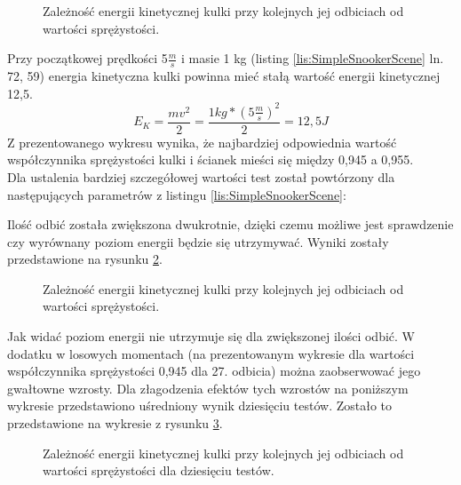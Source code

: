 \begin{figure}[h]

\caption{Zależność energii kinetycznej kulki przy kolejnych jej odbiciach od wartości
sprężystości.}
\label{fig:EKjednoCialo2}
\end{figure}

Przy początkowej prędkości 5$\frac{m}{s}$ i masie 1 kg (listing
\ref{lis:SimpleSnookerScene} ln. 72, 59) energia kinetyczna kulki powinna mieć
stałą wartość energii kinetycznej 12,5.
\begin{equation}
E_{K} = \frac{mv^{2}}{2} = \frac{1kg*(5\frac{m}{s})^{2}}{2} =
12,5J
\end{equation}
Z prezentowanego wykresu wynika, że najbardziej odpowiednia wartość
współczynnika sprężystości kulki i ścianek mieści się między 0,945 a 0,955.\\
\newpage
Dla ustalenia bardziej szczegółowej wartości test został powtórzony dla
następujących parametrów z listingu \ref{lis:SimpleSnookerScene}:


  
Ilość odbić została zwiększona dwukrotnie, dzięki czemu możliwe jest sprawdzenie
czy wyrównany poziom energii będzie się utrzymywać. Wyniki zostały przedstawione
na rysunku \ref{fig:EKjednoCialo3}.

\begin{figure}[h]

\caption{Zależność energii kinetycznej kulki przy kolejnych jej odbiciach od wartości
sprężystości.}
\label{fig:EKjednoCialo3}
\end{figure}

Jak widać poziom energii nie utrzymuje się dla zwiększonej ilości odbić. W
dodatku w losowych momentach (na prezentowanym wykresie dla wartości
współczynnika sprężystości 0,945 dla 27. odbicia) można zaobserwować jego
gwałtowne wzrosty. Dla złagodzenia efektów tych wzrostów na poniższym wykresie
przedstawiono uśredniony wynik dziesięciu testów. Zostało to przedstawione na
wykresie z rysunku \ref{fig:EKjednoCialo4}.

\begin{figure}[h]

\caption{Zależność energii kinetycznej kulki przy kolejnych jej odbiciach od wartości
sprężystości dla dziesięciu testów.}
\label{fig:EKjednoCialo4}
\end{figure}

